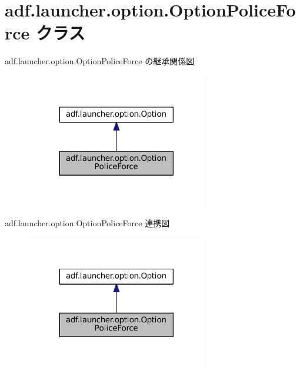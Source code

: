 \hypertarget{classadf_1_1launcher_1_1option_1_1OptionPoliceForce}{}\section{adf.\+launcher.\+option.\+Option\+Police\+Force クラス}
\label{classadf_1_1launcher_1_1option_1_1OptionPoliceForce}


adf.\+launcher.\+option.\+Option\+Police\+Force の継承関係図
\nopagebreak
\begin{figure}[H]
\begin{center}
\leavevmode
\includegraphics[width=225pt]{classadf_1_1launcher_1_1option_1_1OptionPoliceForce__inherit__graph}
\end{center}
\end{figure}


adf.\+launcher.\+option.\+Option\+Police\+Force 連携図
\nopagebreak
\begin{figure}[H]
\begin{center}
\leavevmode
\includegraphics[width=225pt]{classadf_1_1launcher_1_1option_1_1OptionPoliceForce__coll__graph}
\end{center}
\end{figure}
